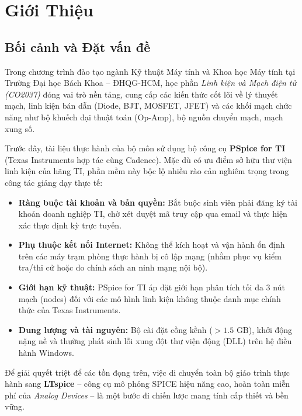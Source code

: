 \documentclass[12pt,a4paper]{report}
\begin{document}
\chapter{Giới Thiệu}

\section{Bối cảnh và Đặt vấn đề}
Trong chương trình đào tạo ngành Kỹ thuật Máy tính và Khoa học Máy tính tại Trường Đại học Bách Khoa -- ĐHQG-HCM, học phần \textit{Linh kiện và Mạch điện tử (CO2037)} đóng vai trò nền tảng, cung cấp các kiến thức cốt lõi về lý thuyết mạch, linh kiện bán dẫn (Diode, BJT, MOSFET, JFET) và các khối mạch chức năng như bộ khuếch đại thuật toán (Op-Amp), bộ nguồn chuyển mạch, mạch xung số.

Trước đây, tài liệu thực hành của bộ môn sử dụng bộ công cụ \textbf{PSpice for TI} (Texas Instruments hợp tác cùng Cadence). Mặc dù có ưu điểm sở hữu thư viện linh kiện của hãng TI, phần mềm này bộc lộ nhiều rào cản nghiêm trọng trong công tác giảng dạy thực tế:
\begin{itemize}[noitemsep]
    \item \textbf{Ràng buộc tài khoản và bản quyền:} Bắt buộc sinh viên phải đăng ký tài khoản doanh nghiệp TI, chờ xét duyệt mã truy cập qua email và thực hiện xác thực định kỳ trực tuyến.
    \item \textbf{Phụ thuộc kết nối Internet:} Không thể kích hoạt và vận hành ổn định trên các máy trạm phòng thực hành bị cô lập mạng (nhằm phục vụ kiểm tra/thi cử hoặc do chính sách an ninh mạng nội bộ).
    \item \textbf{Giới hạn kỹ thuật:} PSpice for TI áp đặt giới hạn phân tích tối đa 3 nút mạch (nodes) đối với các mô hình linh kiện không thuộc danh mục chính thức của Texas Instruments.
    \item \textbf{Dung lượng và tài nguyên:} Bộ cài đặt cồng kềnh ($>1.5\text{ GB}$), khởi động nặng nề và thường phát sinh lỗi xung đột thư viện động (DLL) trên hệ điều hành Windows.
\end{itemize}

Để giải quyết triệt để các tồn đọng trên, việc di chuyển toàn bộ giáo trình thực hành sang \textbf{LTspice} -- công cụ mô phỏng SPICE hiệu năng cao, hoàn toàn miễn phí của \textit{Analog Devices} -- là một bước đi chiến lược mang tính cấp thiết và bền vững.
\end{document}
